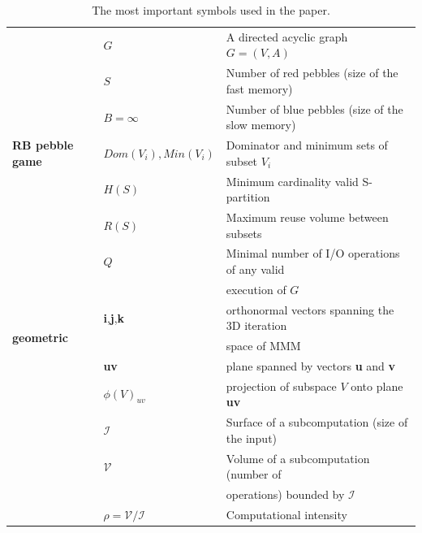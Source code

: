 \documentclass[sigplan,review,anonymous]{acmart}\settopmatter{printfolios=true,printccs=false,printacmref=false}
\begin{document}
\begin{table}[h!]
	\centering
	\footnotesize
	\sf
	\begin{tabular}{@{}l|ll@{}}
		\toprule
		\multirow{7}{*}{\begin{turn}{90}\textbf{RB pebble game}\end{turn}}
		& $G$&A directed acyclic graph $G=(V,A)$\\
		& $S$ & Number of red pebbles (size of the fast memory)\\
		& $B = \infty$ & Number of blue pebbles (size of the slow memory)\\
		& $Dom(V_i), Min(V_i)$ & Dominator and minimum sets of subset $V_i$\\
		& $H(S)$ & Minimum cardinality valid S-partition \\
		& $R(S)$ & Maximum reuse volume between subsets \\
		& $Q$ & Minimal number of I/O operations of any valid \\ 
		& & execution of $G$ \\
		\midrule
		\multirow{3}{*}{\begin{turn}{90}\textbf{geometric}\end{turn}}           
		& \textbf{i},\textbf{j},\textbf{k} & orthonormal vectors spanning the 
		3D iteration\\
		& & space 
		of MMM~\cite{tiling}\\
		& \textbf{uv} & plane spanned by vectors \textbf{u} and \textbf{v}\\
		& $\phi(V)_{uv}$ & projection of subspace $V$ onto plane \textbf{uv}\\
		& $\mathcal{I}$ & Surface of a subcomputation (size of the 
		input)\\
		& $\mathcal{V}$ & Volume of a subcomputation (number of \\
		& & 
		operations) bounded by $\mathcal{I}$\\
		& $\rho = \mathcal{V}/\mathcal{I}$ & Computational 
		intensity \\
		\midrule
		
		\bottomrule
	\end{tabular}
	\caption{The most important symbols used in the paper.}
	\label{tab:symbols}
	\vspace{-0.5em}
\end{table}
\end{document}
